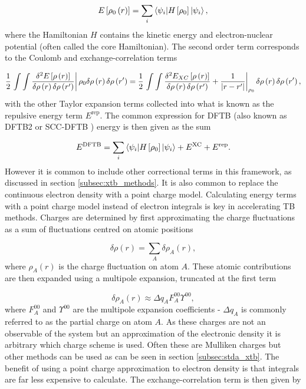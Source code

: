\begin{equation}
    E_{} \left[ \rho_0\left(r\right) \right] =  \sum_i \braket{\psi_i|H_{} \left[ \rho_0 \right]|\psi_i},
\end{equation}
%
where the Hamiltonian $H$ contains the kinetic energy and electron-nuclear potential
(often called the core Hamiltonian). The second order term corresponds to the Coulomb 
and exchange-correlation terms

\begin{equation}
    \frac{1}{2} \left. \int\int \frac{\delta^2 E_{} \left[ \rho\left(r\right) \right]}{\delta \rho\left(r\right)\delta \rho\left(r^\prime\right)} \right\rvert {\rho_0} \delta \rho \left( r \right) \delta \rho \left( r^\prime \right) = \frac{1}{2} \left. \int\int \frac{\delta^2 E_{XC} \left[ \rho\left(r\right) \right]}{\delta \rho\left(r\right)\delta \rho\left(r^\prime\right)} + \frac{1}{\left\lvert r-r^\prime \right\rvert} \right\rvert_{\rho_0} \delta \rho \left( r \right) \delta \rho \left( r^\prime \right),
\end{equation}
%
with the other Taylor expansion terms collected into what is known as the repulsive
energy term $E^\text{rep}$. The common expression for DFTB (also known as DFTB2
or SCC-DFTB \cite{Elstner1998}) energy is then given as the sum

\begin{equation}
    \label{eq:dftb_energies}
    E^{\text{DFTB}} = \sum_i \braket{\psi_i|H_{} \left[ \rho_0 \right]|\psi_i} + E^\text{XC} + E^\text{rep}.
\end{equation}
%
However it is common to include other correctional terms in this framework, as discussed
in section \ref{subsec:xtb_methods}. It is also common to replace the continuous 
electron density with a point charge model. Calculating energy terms with a point
charge model instead of electron integrals is key in accelerating TB methods. Charges
are determined by first approximating the charge fluctuations as a sum of fluctuations 
centred on atomic positions

\begin{equation}
    \delta \rho\left(r\right) = \sum_A \delta \rho_A \left(r\right),
\end{equation}
%
where $\rho_A \left(r\right)$ is the charge fluctuation on atom $A$. These atomic
contributions are then expanded using a multipole expansion, truncated at the first
term

\begin{equation}
    \delta \rho_A \left(r\right) \approx \Delta q_A F_A^{00} \Upsilon^{00},
\end{equation}
%
where $F_A^{00}$ and $\Upsilon^{00}$ are the multipole expansion coefficients - 
$\Delta q_A$ is commonly referred to as the partial charge on atom $A$. As these
charges are not an observable of the system but an approximation of the electronic
density it is arbitrary which charge scheme is used. Often these are Mulliken charges 
but other methods can be used as can be seen in section \ref{subsec:stda_xtb}. The
benefit of using a point charge approximation to electron density is that integrals
are far less expensive to calculate. The exchange-correlation term is then given
by

